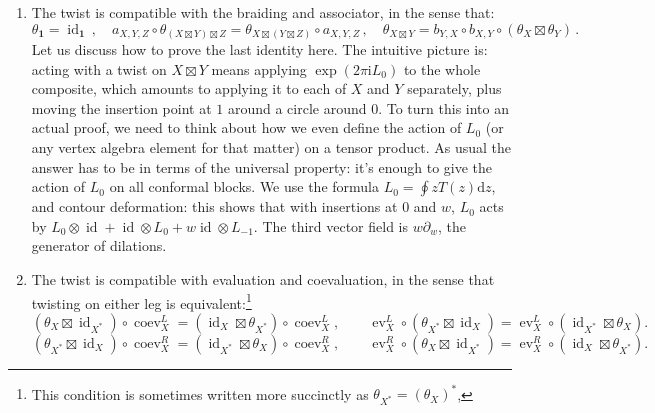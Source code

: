 \documentclass[12pt,letterpaper,reqno]{amsart}
\numberwithin{equation}{section}
\newcommand{\I}{{\mathrm i}}
\newcommand{\e}{{\mathrm e}}
\newcommand\bid{{\mathbf 1}}
\newcommand{\de}{\mathrm{d}}
\DeclareMathOperator{\id}{id}
\DeclareMathOperator{\ev}{ev}
\DeclareMathOperator{\coev}{coev}
\DeclareRobustCommand{\fixme}[1]{\leavevmode{\color{orange}[#1]}}
\begin{document}
\begin{enumerate}
\item The twist is compatible with the braiding and associator,
in the sense that:
\[
\theta_{\bid}=\id_{\bid} \, , \quad
a_{X,Y,Z}\circ \theta_{(X\boxtimes Y)\boxtimes Z}
=
\theta_{X\boxtimes (Y\boxtimes Z)}\circ a_{X,Y,Z} \, , \quad
\theta_{X\boxtimes Y}
=
b_{Y,X}\circ b_{X,Y}\circ (\theta_X\boxtimes \theta_Y) \, .
\]
Let us discuss how to prove the last identity here.
The intuitive picture is: acting with a twist on $X \boxtimes Y$
means applying $\exp(2 \pi \I L_0)$ to the whole composite, which
amounts to applying it to each of $X$ and $Y$ separately, plus
moving the insertion point at $1$ around a circle around $0$.
To turn this into an actual proof, we need to think about how
we even define the action of $L_0$ (or any vertex
algebra element for that matter) on a tensor product.
As usual the answer has to be in terms of the universal property:
it's enough to give the action of $L_0$ on all conformal blocks.
We use the formula
$L_0 = \oint z T(z) \de z$, and contour deformation:
this shows that with insertions at $0$ and $w$,
$L_0$ acts by $L_0 \otimes \id + \id \otimes L_0 + w \id \otimes L_{-1}$. 
The third vector field is $w \partial_w$, the generator of dilations.
\fixme{...}






\item The twist is compatible with evaluation and coevaluation, in the sense that twisting on either leg is equivalent:\footnote{This condition is sometimes written more succinctly as $\theta_{X^*} = (\theta_X)^*$,}
\begin{equation} \label{eq:twist-coev-ev-1}
(\theta_X\boxtimes \id_{X^*})\circ \coev_X^{L}
=
(\id_X\boxtimes \theta_{X^*})\circ \coev_X^{L},
\qquad
\ev_X^{L}\circ(\theta_{X^*}\boxtimes \id_X)
=
\ev_X^{L}\circ(\id_{X^*}\boxtimes \theta_X).
\end{equation}
\begin{equation} \label{eq:twist-coev-ev-2}
(\theta_{X^*}\boxtimes \id_X)\circ \coev_X^{R}
=
(\id_{X^*}\boxtimes \theta_X)\circ \coev_X^{R},
\qquad
\ev_X^{R}\circ(\theta_X\boxtimes \id_{X^*})
=
\ev_X^{R}\circ(\id_X\boxtimes \theta_{X^*}).
\end{equation}
\end{enumerate}
\end{document}
